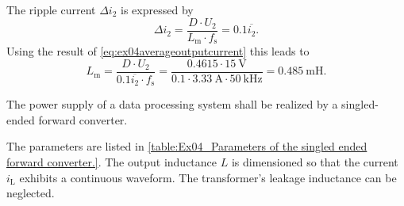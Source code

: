 \begin{solutionblock}
    The ripple current $\Delta i_\mathrm{2}$ is expressed by
    \begin{equation}
        \Delta i_\mathrm{2}= \frac{D \cdot U_\mathrm{2}}{L_\mathrm{m} \cdot f_\mathrm{s}} = 0.1 \overline{i_\mathrm{2}}.
    \end{equation}
    Using the result of \eqref{eq:ex04averageoutputcurrent} this leads to
    \begin{equation}
        L_\mathrm{m}  = \frac{D \cdot U_\mathrm{2}}{0.1 \overline{i_\mathrm{2}} \cdot f_\mathrm{s}} 
        = \frac{0.4615 \cdot \SI{15}{\volt}}{0.1 \cdot \SI{3.33}{\ampere} \cdot \SI{50}{\kilo\hertz}}=\SI{0.485}{\milli\henry}.
    \end{equation}    
\end{solutionblock}





The power supply of a data processing system shall be realized by a singled-ended forward converter.



\FloatBarrier
The parameters are listed in \autoref{table:Ex04_Parameters of the singled ended forward converter.}.
The output inductance $L$ is dimensioned so that the current $i_\mathrm{L}$ exhibits a continuous waveform.
The transformer's leakage inductance can be neglected.

